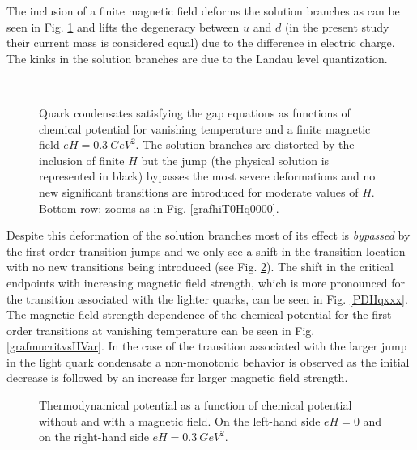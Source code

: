 \documentclass{PoS}
\begin{document}
The inclusion of a finite magnetic field deforms the solution branches as can be seen in Fig. \ref{grafhiT0Hq0300} and lifts the degeneracy between $u$ and $d$ (in the present study their current mass is considered equal) due to the difference in electric charge. The kinks in the solution branches are due to the Landau level quantization. 

\begin{figure}
\\
\caption{
\label{grafhiT0Hq0300} 
Quark condensates satisfying the gap equations as functions of chemical potential for vanishing temperature and a finite magnetic field $e H=0.3~GeV^2$. The solution branches are distorted by the inclusion of finite $H$ but the jump (the physical solution is represented in black) bypasses the most severe deformations and no new significant transitions are introduced for moderate values of $H$. Bottom row: zooms as in Fig. \ref{grafhiT0Hq0000}.}
\end{figure}

Despite this deformation of the solution branches most of its effect is \emph{bypassed} by the first order transition jumps and we only see a shift in the transition location with no new transitions being introduced (see Fig. \ref{grafPotT0Hqxxx}). The shift in the critical endpoints with increasing magnetic field strength, which is more pronounced for the transition associated with the lighter quarks, can be seen in Fig. \ref{PDHqxxx}. The magnetic field strength dependence of the chemical potential for the first order transitions at vanishing temperature can be seen in Fig. \ref{grafmucritvsHVar}. In the case of the transition associated with the larger jump in the light quark condensate a non-monotonic behavior is observed as the initial decrease is followed by an increase for larger magnetic field strength.

\begin{figure}
\centering
\caption{\label{grafPotT0Hqxxx}Thermodynamical potential as a function of chemical potential without and with a magnetic field. On the left-hand side $e H=0$ and on the right-hand side $e H=0.3~GeV^2$.}
\end{figure}
\end{document}
